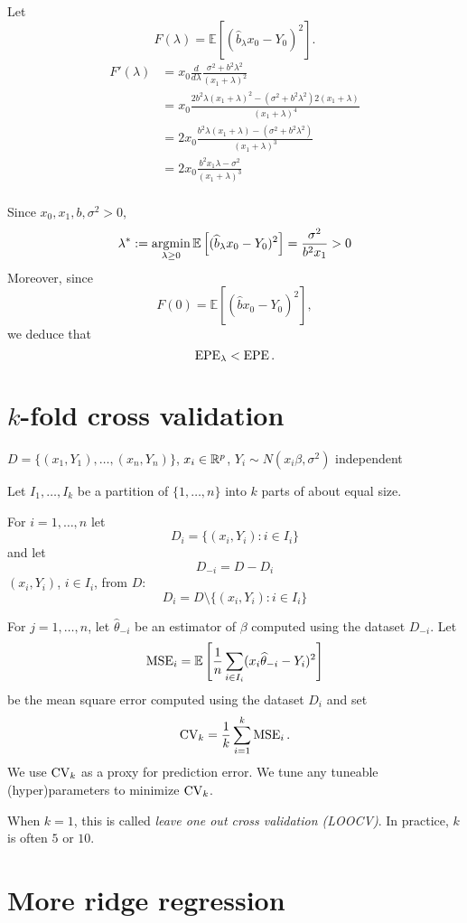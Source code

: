 \documentclass[12pt]{amsart}
\newcommand{\E}[1]{\mathbb{E}\left[#1\right]}
\begin{document}
Let \[F(\lambda) = \E{(\hat b_\lambda x_0 - Y_0)^2}.\]
\begin{align*}
    F'(\lambda) &= x_0\frac d{d\lambda}\frac {\sigma^2 + b^2\lambda^2}{(x_1+\lambda)^2}\\
    &=x_0\frac{2b^2\lambda(x_1+\lambda)^2 
    - (\sigma^2 + b^2\lambda^2)2(x_1 + \lambda)}
    {(x_1+\lambda)^4}\\
    &=2x_0\frac{b^2\lambda(x_1+\lambda) 
    - (\sigma^2 + b^2\lambda^2)}
    {(x_1+\lambda)^3}\\
    &= 2x_0\frac{b^2x_1\lambda - \sigma^2}
    {(x_1+\lambda)^3}\\
\end{align*}

Since $x_0, x_1, b, \sigma^2>0$,
\[
    \lambda^* := \argmin_{\lambda \geq 0} \E{(\hat b_\lambda x_0 - Y_0)^2} = \frac{\sigma^2}{b^2x_1} > 0
\]
Moreover, since
\[
    F(0) = \E{(\hat b x_0 - Y_0)^2},
\]
we deduce that
\[
    \operatorname{EPE}_\lambda < \operatorname{EPE}.
\]

\section{$k$-fold cross validation}

$D = \{(x_1,Y_1),\ldots,(x_n, Y_n)\}$, $x_i\in\mathbb{R}^p$, $Y_i\sim N(x_i\beta, \sigma^2)$ independent

Let $I_1,\ldots,I_k$ be a partition of $\{1,\ldots,n\}$
into $k$ parts of about equal size.

For $i=1,\ldots,n$ let
\[
    D_i = \{(x_i, Y_i) : i\in I_i\}
\]
and let
\[
    D_{-i} = D - D_i
\]
$(x_i, Y_i)$, $i\in I_i$, from $D$:
\[
    D_i = D \setminus \{(x_i, Y_i) : i \in I_i\}
\]

For $j=1,\ldots,n$, let $\hat\theta_{-i}$
be an estimator of $\beta$ computed using the dataset $D_{-i}$.
Let
\[
    \MSE_i = \E{\frac1n\sum_{i\in I_i}(x_i\hat\theta_{-i} - Y_i)^2}
\]
be the mean square error computed using the dataset $D_i$ and set
\[
    \operatorname{CV}_k = \frac1k\sum_{i=1}^k\operatorname{MSE}_i.
\]
We use $\operatorname{CV}_k$ as a proxy for prediction error.
We tune any tuneable (hyper)parameters to minimize $\operatorname{CV}_k$.

When $k=1$, this is called \emph{leave one out cross validation (LOOCV)}.
In practice, $k$ is often $5$ or $10$.

\section{More ridge regression}
\end{document}
